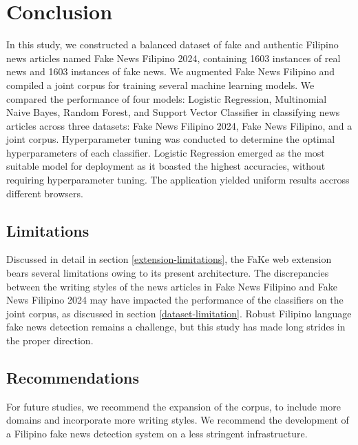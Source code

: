 \chapter{Conclusion}

In this study, we constructed a balanced dataset of fake and authentic Filipino news articles named Fake News Filipino 2024, containing 1603 instances of real news and 1603 instances of fake news. We augmented Fake News Filipino and compiled a joint corpus for training several machine learning models. We compared the performance of four models: Logistic Regression, Multinomial Naive Bayes, Random Forest, and Support Vector Classifier in classifying news articles across three datasets: Fake News Filipino 2024, Fake News Filipino, and a joint corpus. Hyperparameter tuning was conducted to determine the optimal hyperparameters of each classifier. Logistic Regression emerged as the most suitable model for deployment as it boasted the highest accuracies, without requiring hyperparameter tuning. The application yielded uniform results accross different browsers.

\section{Limitations}

Discussed in detail in section \ref{extension-limitations}, the FaKe web extension bears several limitations owing to its present architecture. The discrepancies between the writing styles of the news articles in Fake News Filipino and Fake News Filipino 2024 may have impacted the performance of the classifiers on the joint corpus, as discussed in section \ref{dataset-limitation}. Robust Filipino language fake news detection remains a challenge, but this study has made long strides in the proper direction.

\section{Recommendations}

For future studies, we recommend the expansion of the corpus, to include more domains and incorporate more writing styles. We recommend the development of a Filipino fake news detection system on a less stringent infrastructure. 